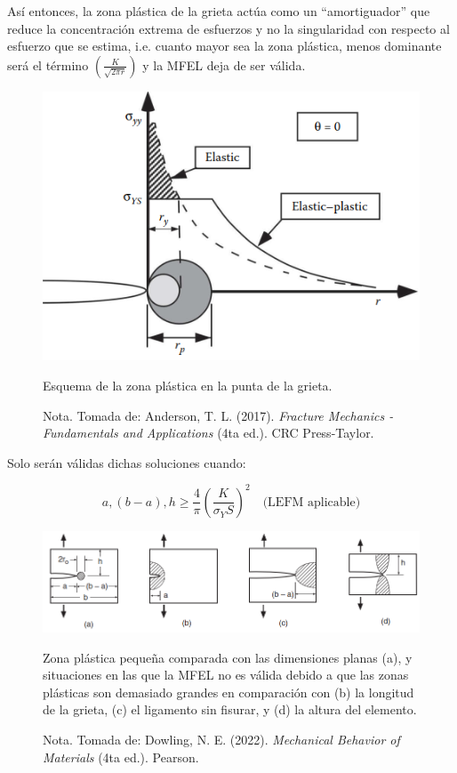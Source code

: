 \documentclass[12pt,letterpaper]{article}
\begin{document}
Así entonces, la zona plástica de la grieta actúa como un “amortiguador” que reduce la concentración extrema de esfuerzos y no la singularidad con respecto al esfuerzo que se estima, i.e.
cuanto mayor sea la zona plástica, menos dominante será el término $\left(\frac{K}{\sqrt{2\pi r}}\right)$ y la MFEL deja de ser válida.
\begin{figure}[H]
    \centering
    \includegraphics[width=0.7\linewidth]{ee.png} %
    \caption{Esquema de la zona plástica en la punta de la grieta.}
    \label{fig:zona_plastica}
    \caption*{Nota. Tomada de: Anderson, T. L. (2017). \textit{Fracture Mechanics - Fundamentals and Applications} (4ta ed.). CRC Press-Taylor.}
\end{figure}
\newpage
Solo serán válidas dichas soluciones cuando:

\[
a, (b-a), h \geq \frac{4}{\pi} \left( \frac{K}{\sigma_YS} \right)^2 \quad \text{(LEFM aplicable)}
\]

\begin{figure}[H]
    \centering
    \includegraphics[width=0.9\linewidth]{ff.png} %
        \caption{Zona plástica pequeña comparada con las dimensiones planas (a), y situaciones en las que la MFEL no es válida debido a que las zonas plásticas son demasiado grandes en comparación con (b) la longitud de la grieta, (c) el ligamento sin fisurar, y (d) la altura del elemento.}
    \label{fig:zona_plastica}
        \caption*{Nota. Tomada de: Dowling, N. E. (2022). \textit{Mechanical Behavior of Materials} (4ta ed.). Pearson.}
    \end{figure}
\end{document}
